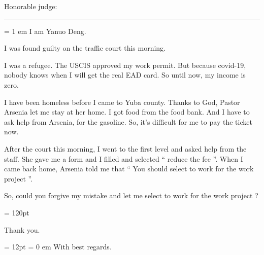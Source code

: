 


{ \medbreak } { \FFaa
Honorable judge:

}

{ \smallbreak } {\par\noindent\hrule} { \smallbreak }

\FFdd
\parindent = 1 em
I am Yanuo Deng. 

I was found guilty on the traffic court this morning. 

I was a refugee. The USCIS approved my work permit. But because covid-19, nobody knows when I will get the real EAD card. So until now, my income is zero. 

I have been homeless before I came to Yuba county. Thanks to God, Pastor Arsenia let me stay at her home. I got food from the food bank. And I have to ask help from Arsenia, for the gasoline. So, it's difficult for me to pay the ticket now.

After the court this morning, I went to the first level and asked help from the staff. 
She gave me a form and I filled and selected `` reduce the fee ''. 
When I came back home, Arsenia told me that `` You should select to work for the work project ''.

So, could you forgive my mistake and let me select to work for the work project ?

\baselineskip = 120pt

Thank you.

\baselineskip = 12pt
\parindent = 0 em
With best regards.

\bye
